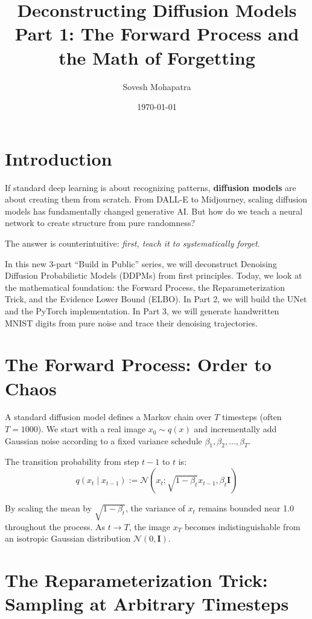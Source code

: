 \documentclass[12pt]{article}
\title{\textbf{Deconstructing Diffusion Models \\ Part 1: The Forward Process and the Math of Forgetting}}
\author{Sovesh Mohapatra}
\date{\today}
\begin{document}
\maketitle

\section*{Introduction}
If standard deep learning is about recognizing patterns, \textbf{diffusion models} are about creating them from scratch. From DALL-E to Midjourney, scaling diffusion models has fundamentally changed generative AI. But how do we teach a neural network to create structure from pure randomness?

The answer is counterintuitive: \textit{first, teach it to systematically forget}.

In this new 3-part ``Build in Public'' series, we will deconstruct Denoising Diffusion Probabilistic Models (DDPMs) from first principles. Today, we look at the mathematical foundation: the Forward Process, the Reparameterization Trick, and the Evidence Lower Bound (ELBO). In Part 2, we will build the UNet and the PyTorch implementation. In Part 3, we will generate handwritten MNIST digits from pure noise and trace their denoising trajectories.

\section*{The Forward Process: Order to Chaos}

A standard diffusion model defines a Markov chain over $T$ timesteps (often $T=1000$). We start with a real image $x_0 \sim q(x)$ and incrementally add Gaussian noise according to a fixed variance schedule $\beta_1, \beta_2, \dots, \beta_T$.

The transition probability from step $t-1$ to $t$ is:
\begin{equation}
    q(x_t \mid x_{t-1}) := \mathcal{N}(x_t; \sqrt{1-\beta_t} x_{t-1}, \beta_t \mathbf{I})
\end{equation}

By scaling the mean by $\sqrt{1-\beta_t}$, the variance of $x_t$ remains bounded near 1.0 throughout the process. As $t \to T$, the image $x_T$ becomes indistinguishable from an isotropic Gaussian distribution $\mathcal{N}(0, \mathbf{I})$.

\section*{The Reparameterization Trick: Sampling at Arbitrary Timesteps}
\end{document}
